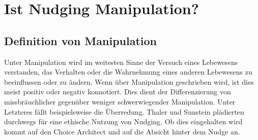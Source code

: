 \chapter{Ist Nudging Manipulation?}

\section{Definition von Manipulation}
Unter Manipulation wird im weitesten Sinne der Versuch eines Lebewesens verstanden, das Verhalten oder die Wahrnehmung eines anderen Lebewesens zu beeinflussen oder zu ändern. \parencite[]{Horn.2019} Wenn über Manipulation geschrieben wird, ist dies meist positiv oder negativ konnotiert. Dies dient der Differenzierung von missbräuchlicher gegenüber weniger schwerwiegender Manipulation. Unter Letzteres fällt beispielsweise die Überredung. Thaler und Sunstein plädierten durchwegs für eine ethische Nutzung von Nudging. Ob dies eingehalten wird kommt auf den Choice Architect und auf die Absicht hinter dem Nudge an. 

